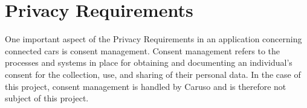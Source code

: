 \section{Privacy Requirements}

One important aspect of the Privacy Requirements in an application concerning connected cars is consent management. Consent management refers to the processes and systems in place for obtaining and documenting an individual's consent for the collection, use, and sharing of their personal data. In the case of this project, consent management is handled by Caruso and is therefore not subject of this project.

